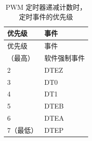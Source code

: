 \begin{longtable}[c]{ |p{6cm}|p{6cm}|}
    \caption{PWM 定时器递减计数时，定时事件的优先级}
    \label{table:evt_prio_d}
    \\\hline
    \rowcolor{lightgray}
    优先级
    & 事件
    \\\hline
    \endfirsthead
    \hline
    \rowcolor{lightgray}   
     优先级
    & 事件
    \\\hline
    \endhead
    \hline
    \endfoot
    1（最高）
    & 软件强制事件
    \\\hline
    2
    & DTEZ
    \\\hline
    3
    & DT0
    \\\hline
    4
    & DT1
    \\\hline
    5
    & DTEB
    \\\hline
    6
    & DTEA
    \\\hline
    7（最低）
    & DTEP    
\end{longtable}